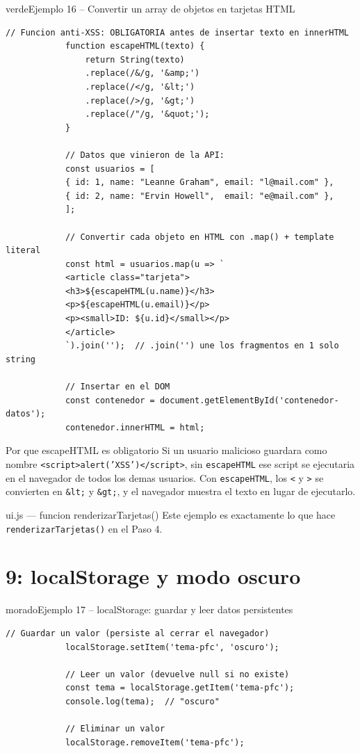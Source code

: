 \documentclass[11pt,a4paper]{article}
\begin{document}
	\begin{cajacodigo}{verde}{Ejemplo 16 -- Convertir un array de objetos en tarjetas HTML}
		\begin{lstlisting}[style=codejs]
			// Funcion anti-XSS: OBLIGATORIA antes de insertar texto en innerHTML
			function escapeHTML(texto) {
				return String(texto)
				.replace(/&/g, '&amp;')
				.replace(/</g, '&lt;')
				.replace(/>/g, '&gt;')
				.replace(/"/g, '&quot;');
			}
			
			// Datos que vinieron de la API:
			const usuarios = [
			{ id: 1, name: "Leanne Graham", email: "l@mail.com" },
			{ id: 2, name: "Ervin Howell",  email: "e@mail.com" },
			];
			
			// Convertir cada objeto en HTML con .map() + template literal
			const html = usuarios.map(u => `
			<article class="tarjeta">
			<h3>${escapeHTML(u.name)}</h3>
			<p>${escapeHTML(u.email)}</p>
			<p><small>ID: ${u.id}</small></p>
			</article>
			`).join('');  // .join('') une los fragmentos en 1 solo string
			
			// Insertar en el DOM
			const contenedor = document.getElementById('contenedor-datos');
			contenedor.innerHTML = html;
		\end{lstlisting}
	\end{cajacodigo}
	
	\begin{cajaconcepto}{Por que escapeHTML es obligatorio}
		Si un usuario malicioso guardara como nombre \texttt{<script>alert('XSS')</script>}, sin \texttt{escapeHTML} ese script se ejecutaria en el navegador de todos los demas usuarios. Con \texttt{escapeHTML}, los \texttt{<} y \texttt{>} se convierten en \texttt{\&lt;} y \texttt{\&gt;}, y el navegador muestra el texto en lugar de ejecutarlo.
	\end{cajaconcepto}
	
	\begin{cajapractica}{ui.js --- funcion renderizarTarjetas()}
		Este ejemplo es exactamente lo que hace \texttt{renderizarTarjetas()} en el Paso 4.
	\end{cajapractica}
	
	\section{9: localStorage y modo oscuro}
	
	\begin{cajacodigo}{morado}{Ejemplo 17 -- localStorage: guardar y leer datos persistentes}
		\begin{lstlisting}[style=codejs]
			// Guardar un valor (persiste al cerrar el navegador)
			localStorage.setItem('tema-pfc', 'oscuro');
			
			// Leer un valor (devuelve null si no existe)
			const tema = localStorage.getItem('tema-pfc');
			console.log(tema);  // "oscuro"
			
			// Eliminar un valor
			localStorage.removeItem('tema-pfc');
		\end{lstlisting}
	\end{cajacodigo}
	
\end{document}
